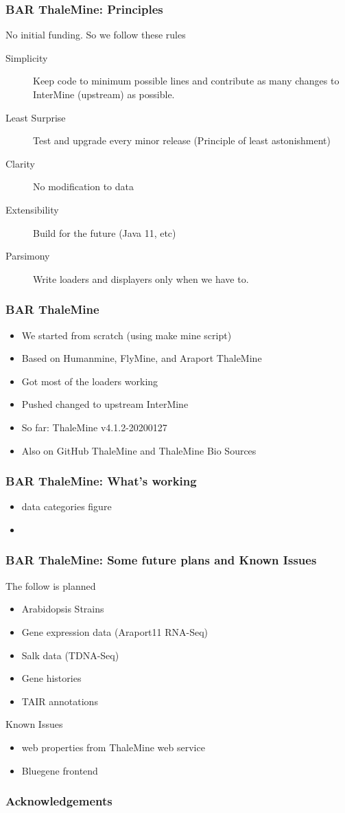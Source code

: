 \documentclass{beamer}
\begin{document}
\begin{frame}
    \frametitle{BAR ThaleMine: Principles}
    No initial funding. So we follow these rules
    \begin{description}
        \item [Simplicity] Keep code to minimum possible lines and contribute as many changes to InterMine (upstream) as possible.
        \item [Least Surprise] Test and upgrade every minor release (Principle of least astonishment)
        \item [Clarity] No modification to data
        \item [Extensibility] Build for the future (Java 11, etc)
        \item [Parsimony] Write loaders and displayers only when we have to.
    \end{description}
\end{frame}

\begin{frame}
    \frametitle{BAR ThaleMine}
    \begin{itemize}
        \item We started from scratch (using make mine script)
        \item Based on Humanmine, FlyMine, and Araport ThaleMine
        \item Got most of the loaders working
        \item Pushed changed to upstream InterMine
        \item So far: ThaleMine v4.1.2-20200127
        \item Also on GitHub ThaleMine and ThaleMine Bio Sources
    \end{itemize}
\end{frame}

\begin{frame}
    \frametitle{BAR ThaleMine: What's working}
    \begin{itemize}
        \item data categories figure
        \item
    \end{itemize}
\end{frame}

\begin{frame}
    \frametitle{BAR ThaleMine: Some future plans and Known Issues}
    The follow is planned
    \begin{itemize}
        \item Arabidopsis Strains
        \item Gene expression data (Araport11 RNA-Seq)
        \item Salk data (TDNA-Seq)
        \item Gene histories
        \item TAIR annotations
    \end{itemize}
    Known Issues
    \begin{itemize}
        \item web properties from ThaleMine web service
        \item Bluegene frontend
    \end{itemize}
\end{frame}

\begin{frame}
    \frametitle{Acknowledgements}
\end{frame}
\end{document}
